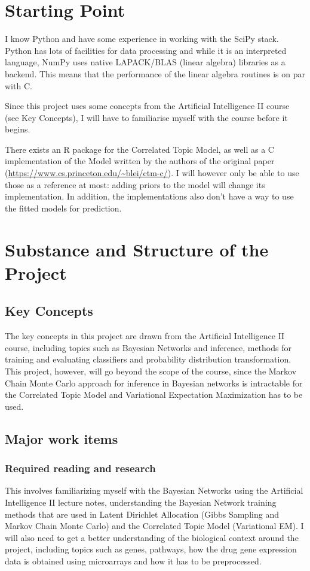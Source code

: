 \documentclass[12pt,a4]{article}
\begin{document}
\section*{Starting Point}

I know Python and have some experience in working with the SciPy stack. Python has lots of facilities for data processing and while it is an interpreted language, NumPy uses native LAPACK/BLAS (linear algebra) libraries as a backend. This means that the performance of the linear algebra routines is on par with C.

Since this project uses some concepts from the Artificial Intelligence II course (see Key Concepts), I will have to familiarise myself with the course before it begins.

There exists an R package for the Correlated Topic Model, as well as a C implementation of the Model written by the authors of the original paper (\url{https://www.cs.princeton.edu/~blei/ctm-c/}). I will however only be able to use those as a reference at most: adding priors to the model will change its implementation. In addition, the implementations also don't have a way to use the fitted models for prediction.

\section*{Substance and Structure of the Project}

\subsection*{Key Concepts}

The key concepts in this project are drawn from the Artificial Intelligence II course, including topics such as Bayesian Networks and inference, methods for training and evaluating classifiers and probability distribution transformation. This project, however, will go beyond the scope of the course, since the Markov Chain Monte Carlo approach for inference in Bayesian networks is intractable for the Correlated Topic Model and Variational Expectation Maximization has to be used.

\subsection*{Major work items}

\subsubsection*{Required reading and research}
This involves familiarizing myself with the Bayesian Networks using the Artificial Intelligence II lecture notes, understanding the Bayesian Network training methods that are used in Latent Dirichlet Allocation (Gibbs Sampling and Markov Chain Monte Carlo) and the Correlated Topic Model (Variational EM). I will also need to get a better understanding of the biological context around the project, including topics such as genes, pathways, how the drug gene expression data is obtained using microarrays and how it has to be preprocessed.
\end{document}

